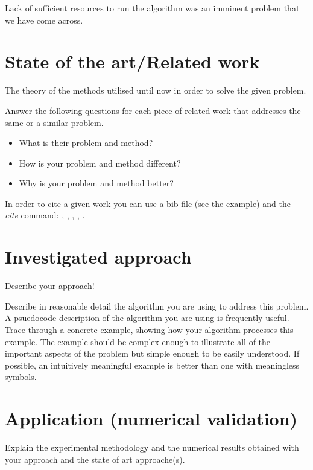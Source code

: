 \documentclass[runningheads,a4paper,11pt]{report}
\begin{document}
Lack of sufficient resources to run the algorithm was an imminent problem that we have come across.



\chapter{State of the art/Related work}
\label{chapter:stateOfArt}


The theory of the methods utilised until now in order to solve the given problem.

Answer the following questions for each piece of related work that addresses the same or a similar problem. 
\begin{itemize}
	\item What is their problem and method? 
	\item How is your problem and method different? 
	\item Why is your problem and method better?
\end{itemize}

In order to cite a given work you can use a bib file (see the example) and the $\ $ \textit{cite} command:
\cite{kennedy1}, \cite{Koh06}, \cite{Berlekamp82}, \cite{Storn95}, \cite{firefox}.



\chapter{Investigated approach}
\label{chapter:proposedApproach}

Describe your approach!

Describe in reasonable detail the algorithm you are using to address this problem. A psuedocode description of the algorithm you are using is frequently useful. Trace through a concrete example, showing how your algorithm processes this example. The example should be complex enough to illustrate all of the important aspects of the problem but simple enough to be easily understood. If possible, an intuitively meaningful example is better than one with meaningless symbols.


\chapter{Application (numerical validation)}
\label{chapter:application}


Explain the experimental methodology and the numerical results obtained with your approach and the state of art approache(s).
\end{document}
